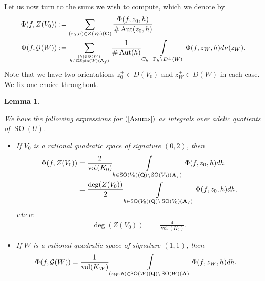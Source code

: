 \documentclass{amsart}
\newtheorem{lemma}[theorem]{Lemma}
\theoremstyle{definition}
\theoremstyle{definition}
\theoremstyle{definition}
\begin{document}
Let us now turn to the sums we wish to compute, which we denote by 
\begin{equation}\begin{aligned}\label{Asums} 
\Phi(f, Z(V_0)) &:= \sum\limits_{ (z_0, h) \in Z(V_0)({\bf{C}}) } \frac{\Phi(f, z_0, h)}{\# \operatorname{Aut}(z_0, h)} \\
\Phi(f, \mathcal{G}(W)) &:= \sum\limits_{ [h] \in \mathfrak{G}(W) \atop h \in \operatorname{GSpin}(W)({\bf{A}}_f) } 
\frac{1}{\# \operatorname{Aut}(h)} \int\limits_{C_h = \Gamma_h \backslash D^{\pm}(W)}  \Phi(f, z_W, h) d \nu(z_W).
\end{aligned}\end{equation}
Note that we have two orientations $z_0^{\pm} \in D(V_0)$ and $z_W^{\pm} \in D(W)$ in each case. We fix one choice throughout.

\begin{lemma}\label{schofer}

We have the following expressions for $(\ref{Asums})$ as integrals over adelic quotients of $\operatorname{SO}(U)$.

\begin{itemize}

\item[(i)] If $V_0$ is a rational quadratic space of signature $(0,2)$, then  
 \begin{equation*}\begin{aligned}
\Phi(f, Z(V_0)) &= \frac{2}{\operatorname{vol}(K_0)} 
\int\limits_{ h \in \operatorname{SO}(V_0)({\bf{Q}}) \backslash \operatorname{SO}(V_0)({\bf{A}}_f)  } \Phi(f, z_0, h) dh \\
&= \frac{\operatorname{deg}(Z(V_0))}{2} 
\int\limits_{ h \in \operatorname{SO}(V_0)({\bf{Q}}) \backslash \operatorname{SO}(V_0)({\bf{A}}_f)  } \Phi(f, z_0, h) dh, \end{aligned}\end{equation*}
where \begin{align*}\operatorname{deg}(Z(V_0)) &= \frac{4}{ \operatorname{vol}(K_0)}. \end{align*}

\item[(ii)] If $W$ is a rational quadratic space of signature $(1,1)$, then 
\begin{align*} \Phi(f, \mathcal{G}(W)) 
&= \frac{1}{ \operatorname{vol}(K_W)} \int\limits_{ (z_W, h) \in \operatorname{SO}(W)({\bf{Q}}) \backslash \operatorname{SO}(W)({\bf{A}})  } \Phi(f, z_W, h) dh. \end{align*}

\end{itemize}

\end{lemma}
\end{document}
